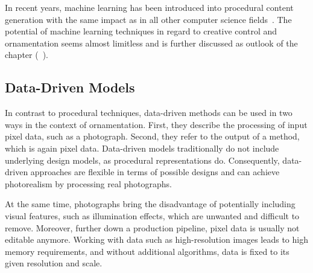 In recent years, machine learning has been introduced into procedural content generation with the same impact as in all other computer science fields~\cite{summerville_2017_pcg}. The potential of machine learning techniques in regard to creative control and ornamentation seems almost limitless and is further discussed as outlook of the chapter (~).






\subsection[Data-Driven]{Data-Driven Models}
\label{subsec:design_models_datadriven}

In contrast to procedural techniques, data-driven methods can be used in two ways in the context of ornamentation. First, they describe the processing of input pixel data, such as a photograph. Second, they refer to the output of a method, which is again pixel data. Data-driven models traditionally do not include underlying design models, as procedural representations do. Consequently, data-driven approaches are flexible in terms of possible designs and can achieve photorealism by processing real photographs.

At the same time, photographs bring the disadvantage of potentially including visual features, such as illumination effects, which are unwanted and difficult to remove. Moreover, further down a production pipeline, pixel data is usually not editable anymore. Working with data such as high-resolution images leads to high memory requirements, and without additional algorithms, data is fixed to its given resolution and scale.

